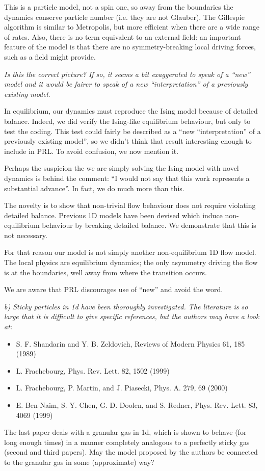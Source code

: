 \documentclass[a4paper,10pt]{article}
\begin{document}
This is a particle model, not a spin one, so away from the boundaries
the dynamics conserve particle number (i.e. they are not Glauber).
The Gillespie algorithm is similar to Metropolis, but more efficient
when there are a wide range of rates.  Also, there is no term
equivalent to an external field: an important feature of the model is
that there are no symmetry-breaking local driving forces, such as a
field might provide.

{\it   Is this the correct picture? If so, it seems a bit exaggerated to
   speak of a ``new'' model and it would be fairer to speak of a new
   ``interpretation'' of a previously existing model.}
  

In equilibrium, our dynamics must reproduce the Ising model because of
detailed balance. Indeed, we did verify the Ising-like equilibrium
behaviour, but only to test the coding.  This test could fairly be
described as a ``new ``interpretation'' of a previously existing
model'', so we didn't think that result interesting enough to include
in PRL.  To avoid confusion, we now mention it.


Perhaps the suspicion the we are simply solving the
Ising model with novel dynamics
is behind the comment: 
 ``I would not say that this work represents a substantial advance''.  
  In fact, we do much more than this.


  The novelty is to show that non-trivial flow behaviour does not
  require violating detailed balance.  Previous 1D models have been
  devised which induce non-equilibrium behaviour by breaking detailed
  balance. We demonstrate that this is not necessary.
 
  For that reason our model is not simply another non-equilibrium 1D
  flow model.  The local physics are equilibrium dynamics; the only
  asymmetry driving the flow is at the boundaries, well away from
  where the transition occurs.
 
  We are aware that PRL discourages use of ``new'' and avoid the word.
 
{\it   
   b) Sticky particles in 1d have been thoroughly investigated. The
   literature is so large that it is difficult to give specific
   references, but the authors may have a look at:
  \begin{itemize}
   \item S. F. Shandarin and Y. B. Zeldovich, Reviews of Modern Physics 61, 185 (1989)
   \item L. Frachebourg, Phys. Rev. Lett. 82, 1502 (1999)
   \item L. Frachebourg, P. Martin, and J. Piasecki, Phys. A. 279, 69 (2000)
   \item E. Ben-Naim, S. Y. Chen, G. D. Doolen, and S. Redner, Phys. Rev.
   Lett. 83, 4069 (1999)
  \end{itemize}
  
   The last paper deals with a granular gas in 1d, which is shown to
   behave (for long enough times) in a manner completely analogous to a
   perfectly sticky gas (second and third papers). May the model proposed
   by the authors be connected to the granular gas in some (approximate)
   way?}
\end{document}
